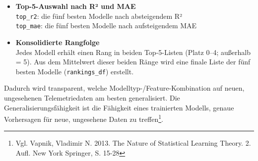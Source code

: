 \begin{itemize}
  \item \textbf{Top-5-Auswahl nach R² und MAE}\\
  \texttt{top\_r2}: die fünf besten Modelle nach absteigendem R²\\
  \texttt{top\_mae}: die fünf besten Modelle nach aufsteigendem MAE
  
  \item \textbf{Konsolidierte Rangfolge}\\
  Jedes Modell erhält einen Rang in beiden Top-5-Listen (Platz 0–4; außerhalb = 5). Aus dem Mittelwert dieser beiden Ränge wird eine finale Liste der fünf besten Modelle (\texttt{rankings\_df}) erstellt.
\end{itemize}

\noindent
Dadurch wird transparent, welche Modelltyp-/Feature-Kombination auf neuen, ungesehenen Telemetriedaten am besten generalisiert. Die Generalisierungsfähigkeit ist die Fähigkeit eines trainierten Modells, genaue Vorhersagen für neue, ungesehene Daten zu treffen\footnote{Vgl. Vapnik, Vladimir N. 2013. The Nature of Statistical Learning Theory. 2. Aufl. New York Springer, S. 15-28}.
